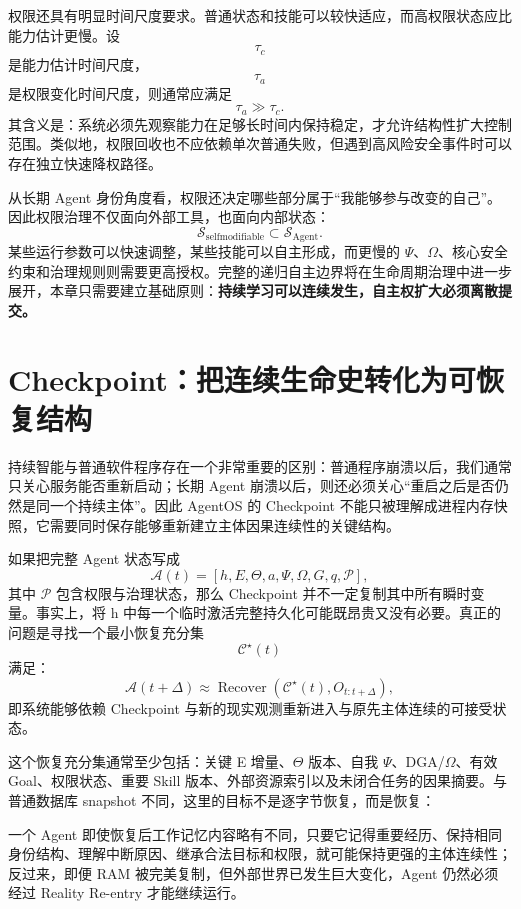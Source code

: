权限还具有明显时间尺度要求。普通状态和技能可以较快适应，而高权限状态应比能力估计更慢。设
\[
\tau_c
\]
是能力估计时间尺度，
\[
\tau_a
\]
是权限变化时间尺度，则通常应满足
\[
\tau_a\gg\tau_c.
\]
其含义是：系统必须先观察能力在足够长时间内保持稳定，才允许结构性扩大控制范围。类似地，权限回收也不应依赖单次普通失败，但遇到高风险安全事件时可以存在独立快速降权路径。

从长期 Agent 身份角度看，权限还决定哪些部分属于“我能够参与改变的自己”。因此权限治理不仅面向外部工具，也面向内部状态：
\[
\mathcal S_{\mathrm{selfmodifiable}}
\subset
\mathcal S_{\mathrm{Agent}}.
\]
某些运行参数可以快速调整，某些技能可以自主形成，而更慢的 \(\Psi\)、\(\Omega\)、核心安全约束和治理规则则需要更高授权。完整的递归自主边界将在生命周期治理中进一步展开，本章只需要建立基础原则：\textbf{持续学习可以连续发生，自主权扩大必须离散提交。}

\section{Checkpoint：把连续生命史转化为可恢复结构}

持续智能与普通软件程序存在一个非常重要的区别：普通程序崩溃以后，我们通常只关心服务能否重新启动；长期 Agent 崩溃以后，则还必须关心“重启之后是否仍然是同一个持续主体”。因此 AgentOS 的 Checkpoint 不能只被理解成进程内存快照，它需要同时保存能够重新建立主体因果连续性的关键结构。

如果把完整 Agent 状态写成
\[
\mathcal A(t)
=
[
h,
E,
\Theta,
a,
\Psi,
\Omega,
G,
q,
\mathcal P
],
\]
其中 \(\mathcal P\) 包含权限与治理状态，那么 Checkpoint 并不一定复制其中所有瞬时变量。事实上，将 h 中每一个临时激活完整持久化可能既昂贵又没有必要。真正的问题是寻找一个最小恢复充分集
\[
\mathcal C^\star(t)
\]
满足：
\[
\mathcal A(t+\Delta)
\approx
\operatorname{Recover}
\left(
\mathcal C^\star(t),
O_{t:t+\Delta}
\right),
\]
即系统能够依赖 Checkpoint 与新的现实观测重新进入与原先主体连续的可接受状态。

这个恢复充分集通常至少包括：关键 E 增量、\(\Theta\) 版本、自我 \(\Psi\)、DGA/\(\Omega\)、有效 Goal、权限状态、重要 Skill 版本、外部资源索引以及未闭合任务的因果摘要。与普通数据库 snapshot 不同，这里的目标不是逐字节恢复，而是恢复：
\begin{statementbox}
\centering
{}
\end{statementbox}
一个 Agent 即使恢复后工作记忆内容略有不同，只要它记得重要经历、保持相同身份结构、理解中断原因、继承合法目标和权限，就可能保持更强的主体连续性；反过来，即便 RAM 被完美复制，但外部世界已发生巨大变化，Agent 仍然必须经过 Reality Re-entry 才能继续运行。

